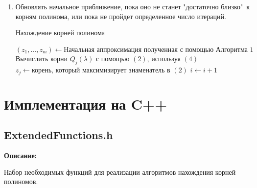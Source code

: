 \documentclass[a4paper,12pt]{article}
\begin{document}
\begin{enumerate}
    \item Обновлять начальное приближение, пока оно не станет "достаточно близко"\ к корням полинома, или пока не пройдет определенное число итераций.
            \begin{algorithm}[H]
                \caption{Нахождение корней полинома}\label{alg:Example}
                \begin{algorithmic}
                \State $(z_1, \text{...}, z_m)\gets\text{Начальная аппроксимация полученная с помощью Алгоритма 1}$
                            \State Вычислить корни $Q_j(\lambda)$ с помощью $(2)$, используя $(4)$
                            \State $z_j \gets \text{корень, который максимизирует знаменатель в } (2)$
                        \EndIf
                    \EndFor
                    \State $i \gets i+1$
                \EndWhile
                \end{algorithmic}
            \end{algorithm}     
\end{enumerate}


\clearpage
\newpage
\section{Имплементация на C++}

\subsection{ExtendedFunctions.h}
\textbf{Описание:}

Набор необходимых функций для реализации алгоритмов нахождения корней полиномов.
\end{document}
